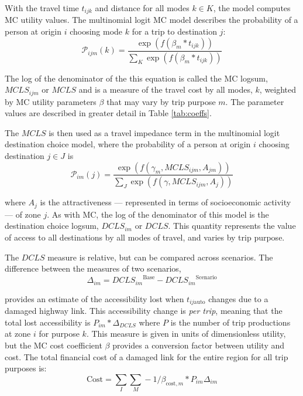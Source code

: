 With the travel time \(t_{ijk}\) and distance for all modes \(k \in K\), the
model computes MC utility values. The multinomial logit MC
model describes the probability of a person at origin \(i\) choosing mode \(k\)
for a trip to destination \(j\):
\begin{equation}
\mathcal{P}_{ijm}(k) = \frac{\exp(f(\beta_m * t_{ijk}))}
{\sum_{K}\exp(f(\beta_m * t_{ijk}))}
  \label{eq:mcp}
\end{equation}

\noindent The log of the denominator of the this equation is called the
MC logsum, \(MCLS_{ijm}\) or \(MCLS\) and is a measure of the travel cost by
all modes, $k$, weighted by MC utility parameters \(\beta\) that may vary by
trip purpose $m$. The parameter values are described in greater detail in
Table \ref{tab:coeffs}.

The \(MCLS\) is then used as a travel impedance term in the multinomial
logit
destination choice model, where the probability of a person at origin \(i\)
choosing destination \(j \in J\) is
\begin{equation}
\mathcal{P}_{im}(j) = \frac{\exp(f(\gamma_m, MCLS_{ijm}, A_{jm}))}
{\sum_{J}\exp(f(\gamma, MCLS_{ijm}, A_j))}
  \label{eq:dcp}
\end{equation}

\noindent where \(A_j\) is the attractiveness --- represented in terms of
socioeconomic activity --- of zone \(j\). As with MC, the log of the
denominator of this model is the
destination choice logsum, \(DCLS_{im}\) or \(DCLS\). This quantity represents the value of access to
all destinations
by all modes of travel, and varies by trip purpose.

The \(DCLS\) measure is relative, but can be compared across
scenarios. The difference between the measures of two scenarios,
\begin{equation}
\Delta_{im} = {DCLS_{im}}^{\mathrm{Base}} - {DCLS_{im}}^{\mathrm{Scenario}}
  \label{eq:deltas}
\end{equation}

 \noindent provides an estimate of the accessibility lost when
 \(t_{ij\mathrm{auto}}\)
changes due to a damaged highway link. This accessibility change is \emph{per
trip},
meaning that the total lost accessibility is \(P_{im} * \Delta_{DCLS}\) where
\(P\) is
the number of trip productions at zone \(i\) for purpose \(k\). This measure is
given in units of dimensionless utility, but the MC cost coefficient
\(\beta\) provides a conversion factor between utility and cost. The total
financial
cost of a damaged link for the entire region for all trip purposes is:
\begin{equation}
\mathrm{Cost} = \sum_{I}\sum_{M} -1 / \beta_{\mathrm{cost},m} * P_{im}
\Delta_{im}
  \label{eq:totalcost}
\end{equation}

